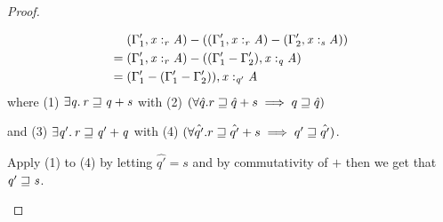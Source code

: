 \begin{proof}
\begin{itemize}
\begin{align*}
  \; & \GRANULEsym{(}  \Gamma'_{{\mathrm{1}}}  \GRANULEsym{,}   \GRANULEmv{x}  :_{\textcolor{coeffectColor}{  \GRANULEnt{r}  } }   \GRANULEnt{A}   \GRANULEsym{)}  \GRANULEsym{-}  \GRANULEsym{(}  \GRANULEsym{(}  \Gamma'_{{\mathrm{1}}}  \GRANULEsym{,}   \GRANULEmv{x}  :_{\textcolor{coeffectColor}{  \GRANULEnt{r}  } }   \GRANULEnt{A}   \GRANULEsym{)}  \GRANULEsym{-}  \GRANULEsym{(}  \Gamma'_{{\mathrm{2}}}  \GRANULEsym{,}   \GRANULEmv{x}  :_{\textcolor{coeffectColor}{  \GRANULEnt{s}  } }   \GRANULEnt{A}   \GRANULEsym{)}  \GRANULEsym{)} \\
= \; & \GRANULEsym{(}  \Gamma'_{{\mathrm{1}}}  \GRANULEsym{,}   \GRANULEmv{x}  :_{\textcolor{coeffectColor}{  \GRANULEnt{r}  } }   \GRANULEnt{A}   \GRANULEsym{)}  \GRANULEsym{-}  \GRANULEsym{(}  \GRANULEsym{(}  \Gamma'_{{\mathrm{1}}}  \GRANULEsym{-}  \Gamma'_{{\mathrm{2}}}  \GRANULEsym{)}  \GRANULEsym{,}   \GRANULEmv{x}  :_{\textcolor{coeffectColor}{  \GRANULEnt{q}  } }   \GRANULEnt{A}   \GRANULEsym{)} \\
= \; & \GRANULEsym{(}  \Gamma'_{{\mathrm{1}}}  \GRANULEsym{-}  \GRANULEsym{(}  \Gamma'_{{\mathrm{1}}}  \GRANULEsym{-}  \Gamma'_{{\mathrm{2}}}  \GRANULEsym{)}  \GRANULEsym{)}  \GRANULEsym{,}   \GRANULEmv{x}  :_{\textcolor{coeffectColor}{  \GRANULEnt{q'}  } }   \GRANULEnt{A}
\end{align*}
%
where (1) $\exists  \GRANULEnt{q}  .\,   \GRANULEnt{r}  \sqsupseteq  \GRANULEnt{q}  \GRANULEsym{+}  \GRANULEnt{s}$ with
(2) $(\maximal{q}{\hat{q}}{r}{\hat{q}+s})$

and (3) $\exists  \GRANULEnt{q'}  .\,   \GRANULEnt{r}  \sqsupseteq  \GRANULEnt{q'}  \GRANULEsym{+}  \GRANULEnt{q}$
with (4) $(\maximal{q'}{\hat{q'}}{r}{\hat{q'}+s})$.

Apply (1) to (4) by letting $\hat{q'} = {s}$
and by commutativity of $+$ then we get that
$\GRANULEnt{q'}  \sqsupseteq  \GRANULEnt{s}$.


\end{itemize}
\end{proof}
